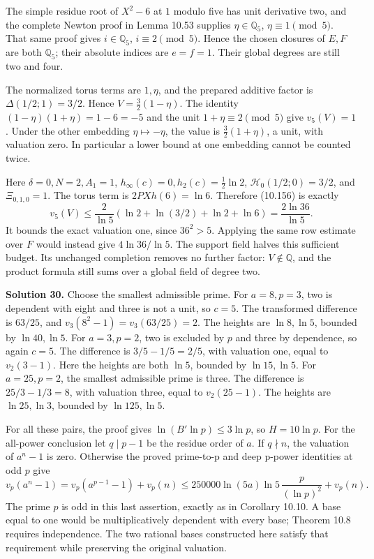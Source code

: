 \documentclass[
  11pt,
  a4paper,
]{article}
\begin{document}
The simple residue root of \(X^2-6\) at \(1\) modulo five has unit
derivative two, and the complete Newton proof in Lemma 10.53 supplies
\(\eta\in\mathbb Q_5\), \(\eta\equiv1\pmod5\). That same proof gives
\(i\in\mathbb Q_5\), \(i\equiv2\pmod5\). Hence the chosen closures of
\(E,F\) are both \(\mathbb Q_5\); their absolute indices are \(e=f=1\).
Their global degrees are still two and four.

The normalized torus terms are \(1,\eta\), and the prepared additive
factor is \(\Delta(1/2;1)=3/2\). Hence \(V=\tfrac32(1-\eta)\). The
identity \((1-\eta)(1+\eta)=1-6=-5\) and the unit
\(1+\eta\equiv2\pmod5\) give \(v_5(V)=1\). Under the other embedding
\(\eta\mapsto-\eta\), the value is \(\tfrac32(1+\eta)\), a unit, with
valuation zero. In particular a lower bound at one embedding cannot be
counted twice.

Here \(\delta=0,N=2,A_1=1\), \(h_\infty(c)=0,h_2(c)=\tfrac12\ln2\),
\(\mathcal H_0(1/2;0)=3/2\), and \(\Xi_{0,1,0}=1\). The torus term is
\(2PXh(6)=\ln6\). Therefore (10.156) is exactly \[
v_5(V)\le \frac2{\ln5}
\left(\ln2+\ln(3/2)+\ln2+\ln6\right)
=\frac{2\ln36}{\ln5}.
\] It bounds the exact valuation one, since \(36^2>5\). Applying the
same row estimate over \(F\) would instead give \(4\ln36/\ln5\). The
support field halves this sufficient budget. Its unchanged completion
removes no further factor: \(V\notin\mathbb Q\), and the product formula
still sums over a global field of degree two.

\textbf{Solution 30.} Choose the smallest admissible prime. For
\(a=8,p=3\), two is dependent with eight and three is not a unit, so
\(c=5\). The transformed difference is \(63/25\), and
\(v_3(8^2-1)=v_3(63/25)=2\). The heights are \(\ln8,\ln5\), bounded by
\(\ln40,\ln5\). For \(a=3,p=2\), two is excluded by \(p\) and three by
dependence, so again \(c=5\). The difference is \(3/5-1/5=2/5\), with
valuation one, equal to \(v_2(3-1)\). Here the heights are both
\(\ln5\), bounded by \(\ln15,\ln5\). For \(a=25,p=2\), the smallest
admissible prime is three. The difference is \(25/3-1/3=8\), with
valuation three, equal to \(v_2(25-1)\). The heights are \(\ln25,\ln3\),
bounded by \(\ln125,\ln5\).

For all these pairs, the proof gives \(\ln(B'\ln p)\le3\ln p\), so
\(H=10\ln p\). For the all-power conclusion let \(q\mid p-1\) be the
residue order of \(a\). If \(q\nmid n\), the valuation of \(a^n-1\) is
zero. Otherwise the proved prime-to-p and deep p-power identities at odd
\(p\) give \[
v_p(a^n-1)
=v_p(a^{p-1}-1)+v_p(n)
\le250000\ln(5a)\ln5\,\frac p{(\ln p)^2}+v_p(n).
\] The prime \(p\) is odd in this last assertion, exactly as in
Corollary 10.10. A base equal to one would be multiplicatively dependent
with every base; Theorem 10.8 requires independence. The two rational
bases constructed here satisfy that requirement while preserving the
original valuation.
\end{document}
